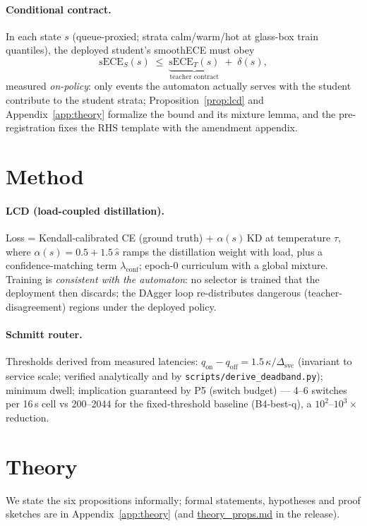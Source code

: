 \documentclass[sigconf,nonacm]{acmart}
\newcommand{\code}[1]{{\footnotesize\url{#1}}}
\newcommand{\sece}{\mathrm{sECE}}
\newcommand{\delt}{\delta}
\begin{document}
\paragraph{Conditional contract.} In each state $s$ (queue-proxied; strata
calm/warm/hot at glass-box train quantiles), the deployed student's smoothECE
must obey
\begin{equation}
\sece_S(s) \;\le\; \underbrace{\sece_T(s)}_{\text{teacher contract}}\;+\;\delt(s),
\end{equation}
measured \emph{on-policy}: only events the automaton actually serves with the
student contribute to the student strata; Proposition~\ref{prop:lcd}
and Appendix~\ref{app:theory} formalize the bound and its mixture
lemma, and the pre-registration fixes the RHS template with the
amendment appendix.

\section{Method}
\label{sec:method}
\paragraph{LCD (load-coupled distillation).} Loss = Kendall-calibrated CE
(ground truth) + $\alpha(s)\,\mathrm{KD}$ at temperature $\tau$, where
$\alpha(s)=0.5+1.5\,\hat s$ ramps the distillation weight with load, plus a
confidence-matching term $\lambda_{\mathrm{conf}}$; epoch-0 curriculum with a
global mixture. Training is \emph{consistent with the automaton}: no selector
is trained that the deployment then discards; the DAgger loop re-distributes
dangerous (teacher-disagreement) regions under the deployed policy.
\paragraph{Schmitt router.} Thresholds derived from measured latencies:
$q_{\mathrm{on}}-q_{\mathrm{off}} = 1.5\,\kappa/\Delta_{\mathrm{svc}}$
(invariant to service scale; verified analytically and by
\texttt{scripts/derive\_deadband.py}); minimum dwell; implication
guaranteed by P5 (switch budget) — 4--6 switches per 16\,s cell vs
200--2044 for the fixed-threshold baseline (B4-best-q), a
$10^2$--$10^3\times$ reduction.

\section{Theory}
\label{sec:theory}
We state the six propositions informally; formal statements, hypotheses and
proof sketches are in Appendix~\ref{app:theory} (and
\code{theory_props.md} in the release).
\end{document}
